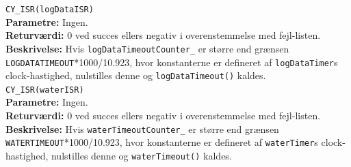 \verb+CY_ISR(logDataISR)+ \\
\textbf{Parametre:} Ingen. \\
\textbf{Returværdi:} 0 ved succes ellers negativ i overenstemmelse med fejl-listen. \\
\textbf{Beskrivelse:} Hvis \verb+logDataTimeoutCounter_+ er større end grænsen \verb+LOGDATATIMEOUT+*1000/10.923, hvor konstanterne er defineret af \verb+logDataTimer+s clock-hastighed, nulstilles denne og \verb+logDataTimeout()+ kaldes.\\

\verb+CY_ISR(waterISR)+ \\
\textbf{Parametre:} Ingen. \\
\textbf{Returværdi:} 0 ved succes ellers negativ i overenstemmelse med fejl-listen. \\
\textbf{Beskrivelse:}  Hvis \verb+waterTimeoutCounter_+ er større end grænsen \verb+WATERTIMEOUT+*1000/10.923, hvor konstanterne er defineret af \verb+waterTimer+s clock-hastighed, nulstilles denne og \verb+waterTimeout()+ kaldes.\\
